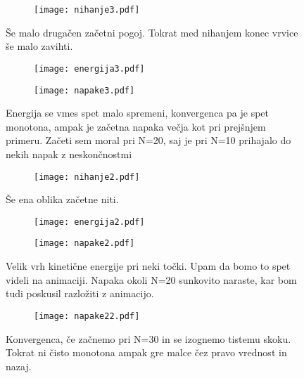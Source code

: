 \documentclass{article}
\begin{document}
\begin{figure}[H]
\centering
\begin{subfigure}{\textwidth}
\texttt{[image: nihanje3.pdf]}
\end{subfigure}
\caption*{Še malo drugačen začetni pogoj. Tokrat med nihanjem konec vrvice še malo zavihti.}
\end{figure}

\begin{figure}[H]
\centering
\begin{subfigure}{.49\textwidth}
\texttt{[image: energija3.pdf]}
\end{subfigure}
\begin{subfigure}{.49\textwidth}
\texttt{[image: napake3.pdf]}
\end{subfigure}
\caption*{Energija se vmes spet malo spremeni, konvergenca pa je spet monotona, ampak je začetna napaka večja kot pri prejšnjem primeru. Začeti sem moral pri N=20, saj je pri N=10 prihajalo do nekih napak z neskončnostmi}
\end{figure}

\begin{figure}[H]
\centering
\begin{subfigure}{\textwidth}
\texttt{[image: nihanje2.pdf]}
\end{subfigure}
\caption*{Še ena oblika začetne niti.}
\end{figure}

\begin{figure}[H]
\centering
\begin{subfigure}{.49\textwidth}
\texttt{[image: energija2.pdf]}
\end{subfigure}
\begin{subfigure}{.49\textwidth}
\texttt{[image: napake2.pdf]}
\end{subfigure}
\caption*{Velik vrh kinetične energije pri neki točki. Upam da bomo to spet videli na animaciji. Napaka okoli N=20 sunkovito naraste, kar bom tudi poskusil razložiti z animacijo.}
\end{figure}

\begin{figure}[H]
\centering
\begin{subfigure}{.5\textwidth}
\texttt{[image: napake22.pdf]}
\end{subfigure}
\caption*{Konvergenca, če začnemo pri N=30 in se izognemo tistemu skoku. Tokrat ni čisto monotona ampak gre malce čez pravo vrednost in nazaj.}
\end{figure}
\end{document}
